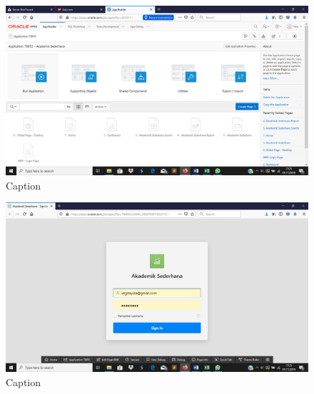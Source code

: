 \begin{enumerate}
\begin{figure}[!htbp]
    \centering
    \includegraphics[scale=0.3]{figure/18.png}
    \caption{Caption}
    \label{fig:my_label}
\end{figure}

\begin{figure}[!htbp]
    \centering
    \includegraphics[scale=0.3]{figure/19.png}
    \caption{Caption}
    \label{fig:my_label}
\end{figure}


\end{enumerate}
